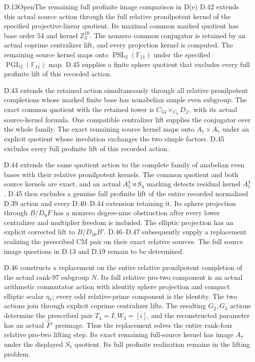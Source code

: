 \begin{statement}{D.13}{Open}{The remaining full profinite image comparison in D(e)}
D.42 extends this actual source action through the full relative
pronilpotent kernel of the specified projective-linear quotient.
Its maximal common marked quotient has base order $54$ and kernel
$\mathbb Z_3^{10}$. The nonzero common conjugator is retained by
an actual coprime centralizer lift, and every projection kernel is
computed. The remaining source kernel maps onto
$\operatorname{PSL}_2(\mathbb F_{11})$ under the specified
$\operatorname{PGL}_2(\mathbb F_{11})$ map. D.45 supplies a finite sphere quotient that excludes every full profinite lift of this recorded action.


D.43 extends the retained action simultaneously through all relative
pronilpotent completions whose marked finite base has nonabelian
simple even subgroup. The exact common quotient with the retained
tower is $C_{54}\times_{C_6}D_{\mathscr J}$, with its actual
source-kernel formula. One compatible centralizer lift supplies the
conjugator over the whole family. The exact remaining source kernel
maps onto $A_7\times A_7$ under an explicit quotient whose involution
exchanges the two simple factors. D.45 excludes every full profinite lift of this recorded action.

D.44 extends the same quotient action to the complete family of
anabelian even bases with their relative pronilpotent kernels.
The common quotient and both source kernels are exact, and an
actual $A_5^4\rtimes S_4$ marking detects residual kernel $A_5^4$.
D.45 then excludes a genuine full profinite lift of the entire
recorded normalized D.39 action and every D.40--D.44 extension
retaining it. Its sphere projection through $B/D_9F$ has a
nonzero degree-nine obstruction after every lower centralizer
and multiplier freedom is included. The elliptic projection
has an explicit corrected lift to $B/D_{10}B'$. D.46--D.47 subsequently supply a replacement realizing the prescribed
CM pair on their exact relative sources. The full source image
questions in D.13 and D.19 remain to be determined.

D.46 constructs a replacement on the entire relative pronilpotent
completion of the actual rank-97 subgroup $N$. Its full relative
pro-two component is an actual arithmetic commutator action with
identity sphere projection and compact elliptic scalar $\eta_*$;
every odd relative-prime component is the identity. The two actions
join through explicit coprime centralizer lifts. The resulting
$G_2,G_3$ actions determine the prescribed pair $T_4=I,W_3=[i]$,
and the reconstructed parameter has an actual $\widehat F'$ preimage.
Thus the replacement solves the entire rank-four relative pro-two
lifting step. Its exact remaining full-source kernel has image
$A_7$ under the displayed $S_7$ quotient. Its full profinite
realization remains in the lifting problem.


\end{statement}
